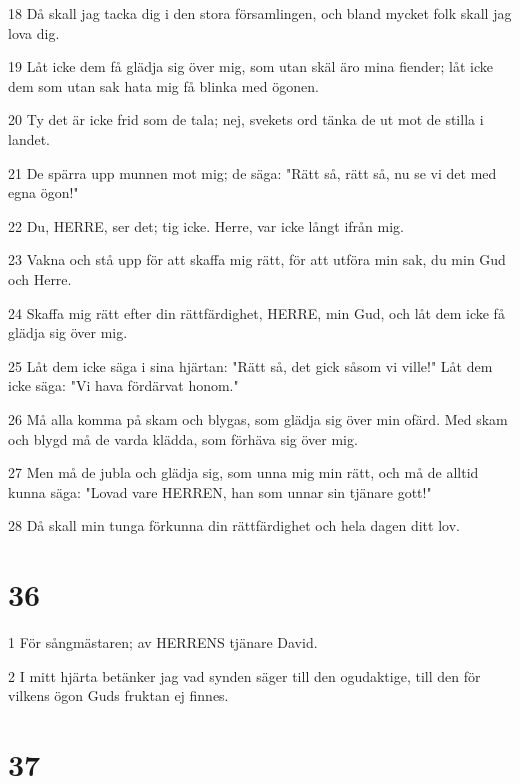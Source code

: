 \par 18 Då skall jag tacka dig i den stora församlingen, och bland mycket folk skall jag lova dig.
\par 19 Låt icke dem få glädja sig över mig, som utan skäl äro mina fiender; låt icke dem som utan sak hata mig få blinka med ögonen.
\par 20 Ty det är icke frid som de tala; nej, svekets ord tänka de ut mot de stilla i landet.
\par 21 De spärra upp munnen mot mig; de säga: "Rätt så, rätt så, nu se vi det med egna ögon!"
\par 22 Du, HERRE, ser det; tig icke. Herre, var icke långt ifrån mig.
\par 23 Vakna och stå upp för att skaffa mig rätt, för att utföra min sak, du min Gud och Herre.
\par 24 Skaffa mig rätt efter din rättfärdighet, HERRE, min Gud, och låt dem icke få glädja sig över mig.
\par 25 Låt dem icke säga i sina hjärtan: "Rätt så, det gick såsom vi ville!" Låt dem icke säga: "Vi hava fördärvat honom."
\par 26 Må alla komma på skam och blygas, som glädja sig över min ofärd. Med skam och blygd må de varda klädda, som förhäva sig över mig.
\par 27 Men må de jubla och glädja sig, som unna mig min rätt, och må de alltid kunna säga: "Lovad vare HERREN, han som unnar sin tjänare gott!"
\par 28 Då skall min tunga förkunna din rättfärdighet och hela dagen ditt lov.

\chapter{36}

\par 1 För sångmästaren; av HERRENS tjänare David.
\par 2 I mitt hjärta betänker jag vad synden säger till den ogudaktige, till den för vilkens ögon Guds fruktan ej finnes.

\chapter{37}

